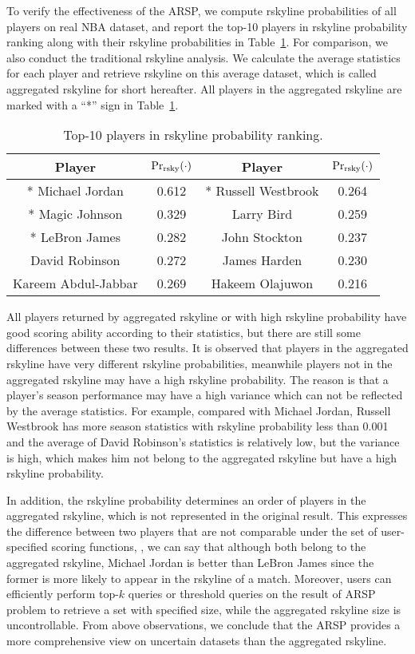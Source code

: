To verify the effectiveness of the ARSP, we compute rskyline probabilities of all players on real \textsc{NBA} dataset, and report the top-10 players in rskyline probability ranking along with their rskyline probabilities in Table~\ref{tab:top-10}.
For comparison, we also conduct the traditional rskyline analysis.
We calculate the average statistics for each player and retrieve rskyline on this average dataset, which is called aggregated rskyline for short hereafter.
All players in the aggregated rskyline are marked with a ``*'' sign in Table~\ref{tab:top-10}.
\begin{table}[htb]
	\centering
	\caption{Top-10 players in rskyline probability ranking.}
	\label{tab:top-10}
	\begin{tabular}{|c|c|c|c|}
		\hline
		\textbf{Player} & $\Pr_{\rm rsky}(\cdot)$ & \textbf{Player} & $\Pr_{\rm rsky}(\cdot)$ \\ \hline \hline
		* Michael Jordan & 0.612 & * Russell Westbrook & 0.264 \\ \hline
		* Magic Johnson & 0.329 & Larry Bird & 0.259 \\ \hline
		* LeBron James & 0.282 & John Stockton & 0.237 \\ \hline
		David Robinson & 0.272 & James Harden & 0.230 \\ \hline
		Kareem Abdul-Jabbar & 0.269 & Hakeem Olajuwon & 0.216 \\ \hline
	\end{tabular}
\end{table}

All players returned by aggregated rskyline or with high rskyline probability have good scoring ability according to their statistics, but there are still some differences between these two results.
It is observed that players in the aggregated rskyline have very different rskyline probabilities, meanwhile players not in the aggregated rskyline may have a high rskyline probability.
The reason is that a player's season performance may have a high variance which can not be reflected by the average statistics.
For example, compared with Michael Jordan, Russell Westbrook has more season statistics with rskyline probability less than 0.001 and the average of David Robinson's statistics is relatively low, but the variance is high, which makes him not belong to the aggregated rskyline but have a high rskyline probability.

In addition, the rskyline probability determines an order of players in the aggregated rskyline, which is not represented in the original result.
This expresses the difference between two players that are not comparable under the set of user-specified scoring functions, \eg, we can say that although both belong to the aggregated rskyline, Michael Jordan is better than LeBron James since the former is more likely to appear in the rskyline of a match.
Moreover, users can efficiently perform top-$k$ queries or threshold queries on the result of ARSP problem to retrieve a set with specified size, while the aggregated rskyline size is uncontrollable.
From above observations, we conclude that the ARSP provides a more comprehensive view on uncertain datasets than the aggregated rskyline.

